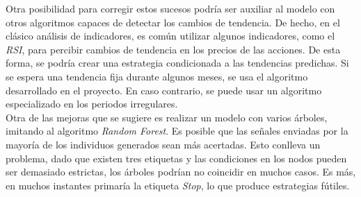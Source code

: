 Otra posibilidad para corregir estos sucesos podr\'ia ser auxiliar al modelo con otros algoritmos capaces de detectar los cambios de tendencia. De hecho, en el cl\'asico an\'alisis de indicadores, es com\'un utilizar algunos indicadores, como el \textit{RSI}, para percibir cambios de tendencia en los precios de las acciones. De esta forma, se podr\'ia crear una estrategia condicionada a las tendencias predichas. Si se espera una tendencia fija durante algunos meses, se usa el algoritmo desarrollado en el proyecto. En caso contrario, se puede usar un algoritmo especializado en los periodos irregulares. \\

Otra de las mejoras que se sugiere es realizar un modelo con varios \'arboles, imitando al algoritmo \textit{Random Forest}. Es posible que las se\~nales enviadas por la mayor\'ia de los individuos generados sean m\'as acertadas. Esto conlleva un problema, dado que existen tres etiquetas y las condiciones en los nodos pueden ser demasiado estrictas, los \'arboles podr\'ian no coincidir en muchos casos. Es m\'as, en muchos instantes primar\'ia la etiqueta \textit{Stop}, lo que produce estrategias f\'utiles.